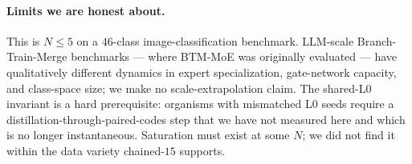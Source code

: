 \documentclass[11pt]{article}
\begin{document}
\paragraph{Limits we are honest about.}
This is $N \leq 5$ on a $46$-class image-classification benchmark.
LLM-scale Branch-Train-Merge benchmarks --- where BTM-MoE was
originally evaluated --- have qualitatively different dynamics in
expert specialization, gate-network capacity, and class-space size; we
make no scale-extrapolation claim. The shared-L0 invariant is a
hard prerequisite: organisms with mismatched L0 seeds require a
distillation-through-paired-codes step that we have not measured here
and which is no longer instantaneous. Saturation must exist at some
$N$; we did not find it within the data variety chained-$15$ supports.



\end{document}

